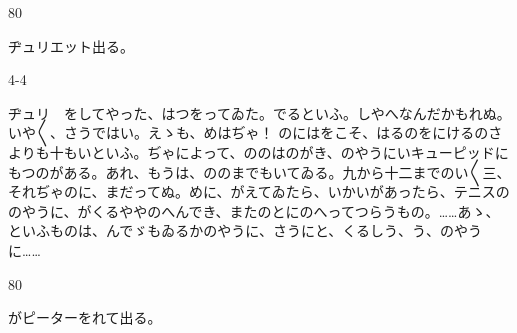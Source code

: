 \documentclass[tate,paper=b6j,jafontsize=9pt]{jlreq}
\begin{document}
\begin{azconvIndented}{8\zw}{0\zw}

ヂュリエット出る。

\end{azconvIndented}
\begin{azconvIndented}{4\zw}{-4\zw}

ヂュリ　をしてやった、はつをってゐた。でるといふ。しやへなんだかもれぬ。いや{〳〵}、さうではい。えゝも、めはぢゃ！ のにはをこそ、はるのをにけるのさよりも十もいといふ。ぢゃによって、ののはのがき、のやうにいキューピッドにもつのがある。あれ、もうは、ののまでもいてゐる。九から十二までのい{〳〵}三、それぢゃのに、まだってぬ。めに、がえてゐたら、いかいがあったら、テニスののやうに、がくるややのへんでき、またのとにのへってつらうもの。……あゝ、といふものは、んでゞもゐるかのやうに、さうにと、くるしう、う、のやうに……

\end{azconvIndented}
\begin{azconvIndented}{8\zw}{0\zw}

がピーターをれて出る。

\end{azconvIndented}
\end{document}
